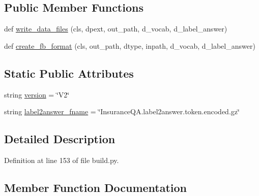 \subsection*{Public Member Functions}
\begin{DoxyCompactItemize}
\item 
def \hyperlink{classparlai_1_1tasks_1_1insuranceqa_1_1build_1_1ParseInsuranceQAV2_a8a510d31a4f0b733beb887de3c8379b0}{write\+\_\+data\+\_\+files} (cls, dpext, out\+\_\+path, d\+\_\+vocab, d\+\_\+label\+\_\+answer)
\item 
def \hyperlink{classparlai_1_1tasks_1_1insuranceqa_1_1build_1_1ParseInsuranceQAV2_abaa749229881633590c411cdaf79c6ff}{create\+\_\+fb\+\_\+format} (cls, out\+\_\+path, dtype, inpath, d\+\_\+vocab, d\+\_\+label\+\_\+answer)
\end{DoxyCompactItemize}
\subsection*{Static Public Attributes}
\begin{DoxyCompactItemize}
\item 
string \hyperlink{classparlai_1_1tasks_1_1insuranceqa_1_1build_1_1ParseInsuranceQAV2_a3e6db8ab79db9655ff077b13b84d1c1b}{version} = \char`\"{}V2\char`\"{}
\item 
string \hyperlink{classparlai_1_1tasks_1_1insuranceqa_1_1build_1_1ParseInsuranceQAV2_a60ef361268188ec13f71fc9a436d3d7d}{label2answer\+\_\+fname} = \char`\"{}Insurance\+Q\+A.\+label2answer.\+token.\+encoded.\+gz\char`\"{}
\end{DoxyCompactItemize}


\subsection{Detailed Description}


Definition at line 153 of file build.\+py.



\subsection{Member Function Documentation}
\mbox{\label{classparlai_1_1tasks_1_1insuranceqa_1_1build_1_1ParseInsuranceQAV2_abaa749229881633590c411cdaf79c6ff}} 
